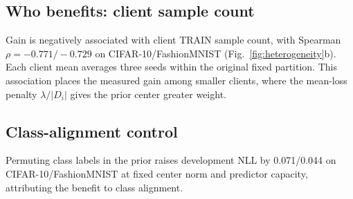 \subsection{Who benefits: client sample count}
Gain is negatively associated with client TRAIN sample count, with Spearman $\rho=-0.771/-0.729$ on CIFAR-10/FashionMNIST (Fig.~\ref{fig:heterogeneity}b). Each client mean averages three seeds within the original fixed partition. This association places the measured gain among smaller clients, where the mean-loss penalty $\lambda/|D_i|$ gives the prior center greater weight.

\subsection{Class-alignment control}
Permuting class labels in the prior raises development NLL by 0.071/0.044 on CIFAR-10/FashionMNIST at fixed center norm and predictor capacity, attributing the benefit to class alignment.
